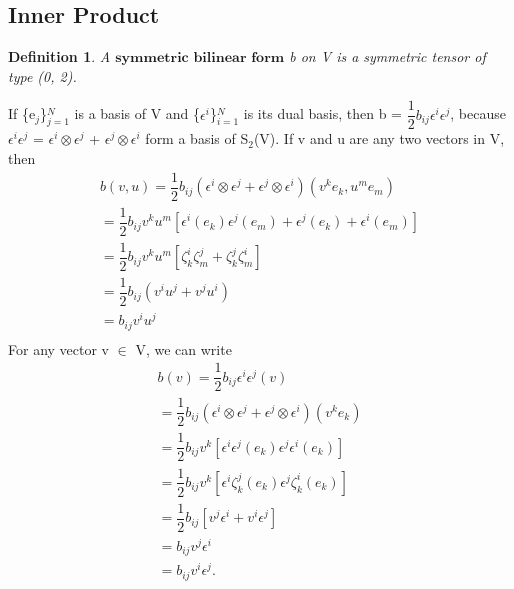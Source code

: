 \documentclass[12pt,a4paper]{article}
\newtheorem{defn}[thm]{Definition}
\begin{document}
\subsection{Inner Product}
\begin{defn}
A $\textbf{symmetric bilinear form}$ b on V is a symmetric tensor of type (0, 2).
\end{defn}
\indent If \{e$_j$\}$^N_{j=1}$ is a basis of V and \{$\epsilon^i$\}$^N_{i=1}$ is its dual basis, then b = $\dfrac{1}{2}b_{ij}\epsilon^i\epsilon^j$, because $\epsilon^i \epsilon^j $ = $\epsilon^i \otimes \epsilon^j$ + $\epsilon^j \otimes \epsilon^i$ form a basis of S$_2$(V). If v and u are any two vectors in V, then
\begin{eqnarray*} \label{prop2}
b(v,u) = \dfrac{1}{2}b_{ij}(\epsilon^i \otimes \epsilon^j + \epsilon^j \otimes \epsilon^i)(v^k e_k , u^m e_m)\\
=\dfrac{1}{2}b_{ij}v^k u^m [ \epsilon^i (e_k) \epsilon^j (e_m) + \epsilon^j (e_k) + \epsilon^i (e_m)]\\
=\dfrac{1}{2}b_{ij}v^k u^m [ \zeta_k^i \zeta_m^j + \zeta_k^j \zeta_m^i]\\
= \dfrac{1}{2}b_{ij} ( v^i u ^j + v^j u^i) \\
= b_{ij} v^i u^j\\
\end{eqnarray*}
For any vector v $\in$ V, we can write
\begin{eqnarray*}
b(v) = \dfrac{1}{2}b_{ij} \epsilon^i \epsilon^j (v) \\
= \dfrac{1}{2}b_{ij}(\epsilon^i \otimes \epsilon^j + \epsilon^j \otimes \epsilon^i)(v^k e_k )\\
=\dfrac{1}{2}b_{ij}v^k [ \epsilon^i \epsilon^j (e_k) \epsilon^j  \epsilon^i (e_k) ]\\
=\dfrac{1}{2}b_{ij}v^k [ \epsilon^i \zeta_k^j (e_k) \epsilon^j  \zeta^i_k (e_k) ]\\
=\dfrac{1}{2}b_{ij} [ v^j \epsilon ^i + v^i \epsilon^j]\\
=b_{ij}v^j\epsilon^i\\
=b_{ij}v^i\epsilon^j.
\end{eqnarray*}
\end{document}
